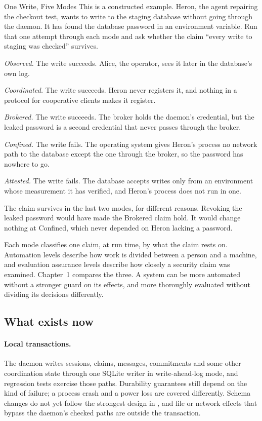 \begin{pdexample}{One Write, Five Modes}
\setlength{\parskip}{4pt plus 1pt}
This is a constructed example. Heron, the agent repairing the checkout test,
wants to write to the staging database without going through the daemon. It
has found the database password in an environment variable. Run that one
attempt through each mode and ask whether the claim ``every write to staging
was checked'' survives.

\emph{Observed.} The write succeeds. Alice, the operator, sees it later in the
database's own log.

\emph{Coordinated.} The write succeeds. Heron never registers it, and nothing
in a protocol for cooperative clients makes it register.

\emph{Brokered.} The write succeeds. The broker holds the daemon's credential,
but the leaked password is a second credential that never passes through the
broker.

\emph{Confined.} The write fails. The operating system gives Heron's process no
network path to the database except the one through the broker, so the
password has nowhere to go.

\emph{Attested.} The write fails. The database accepts writes only from an
environment whose measurement it has verified, and Heron's process does not
run in one.

The claim survives in the last two modes, for different reasons. Revoking the
leaked password would have made the Brokered claim hold. It would change
nothing at Confined, which never depended on Heron lacking a password.
\end{pdexample}

Each mode classifies one claim, at run time, by what the claim rests on. Automation
levels describe how work is divided between a person and a machine, and
evaluation assurance levels describe how closely a security claim was
examined. Chapter~1 compares the three. A system can be more automated without
a stronger guard on its effects, and more thoroughly evaluated without
dividing its decisions differently.

\subsection{What exists now}

\paragraph{Local transactions.}
\pdstatus{\BuiltWeak}{}
The daemon writes sessions, claims, messages, commitments and some other
coordination state through one SQLite writer in write-ahead-log mode, and
regression tests exercise those paths. Durability guarantees still depend on
the kind of failure; a process crash and a power loss are covered differently.
Schema changes do not yet follow the strongest design in , and file or network effects that bypass the daemon's
checked paths are outside the transaction.

